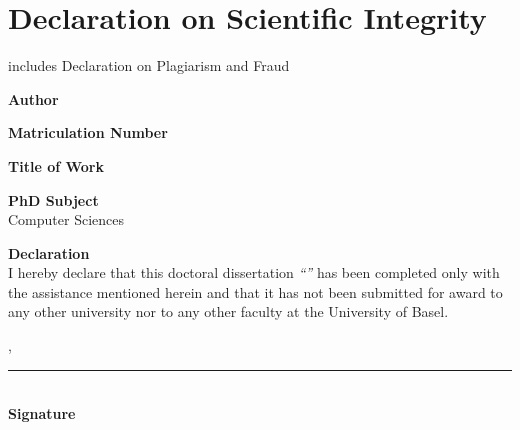 
\chapter*{Declaration on Scientific Integrity}

\noindent includes Declaration on Plagiarism and Fraud \vspace{1cm}

\noindent \textbf{Author} \\
\thesisauthor

\vspace*{0.25cm}

\noindent \textbf{Matriculation Number} \\
\thesismatriculation

\vspace*{0.25cm}

\noindent \textbf{Title of Work} \\
\thesistitle

\vspace*{0.25cm}

\noindent \textbf{PhD Subject} \\
Computer Sciences

\vspace*{0.25cm}

\noindent \textbf{Declaration} \\
\noindent I hereby declare that this doctoral dissertation \emph{``\thesistitle''} has been completed only with the assistance mentioned herein and that it has not been submitted for award to any other university nor to any other faculty at the University of Basel.


\vspace*{0.5cm}

\noindent \thesisprintingplace, \thesisdateofhandin
\vspace*{0.25cm}

\begin{flushright}
\rule{75mm}{\boldrulethickness} \\
\textbf{Signature}
\end{flushright}


\clearpage
